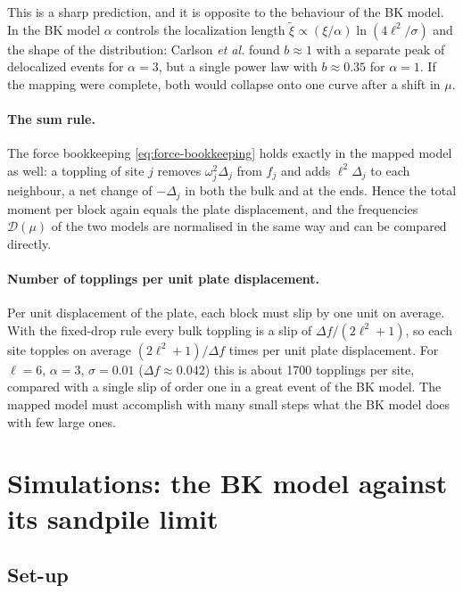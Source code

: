 This is a sharp prediction, and it is opposite to the behaviour of the BK model. In the BK model $\alpha$ controls the localization length
$\tilde\xi\propto(\xi/\alpha)\ln(4\ell^2/\sigma)$ and the shape of the distribution: Carlson \emph{et al.} found $b\approx1$ with a separate peak of
delocalized events for $\alpha=3$, but a single power law with $b\approx0.35$ for $\alpha=1$. If the mapping were complete, both would collapse onto
one curve after a shift in $\mu$.

\paragraph{The sum rule.} The force bookkeeping \cref{eq:force-bookkeeping} holds exactly in the mapped model as well: a toppling of site $j$ removes
$\omega_j^2\Delta_j$ from $f_j$ and adds $\ell^2\Delta_j$ to each neighbour, a net change of $-\Delta_j$ in both the bulk and at the ends. Hence the
total moment per block again equals the plate displacement, and the frequencies $\mathcal D(\mu)$ of the two models are normalised in the same way
and can be compared directly.

\paragraph{Number of topplings per unit plate displacement.} Per unit displacement of the plate, each block must slip by one unit on average. With the
fixed-drop rule every bulk toppling is a slip of $\Delta f/(2\ell^2+1)$, so each site topples on average $(2\ell^2+1)/\Delta f$ times per unit plate
displacement. For $\ell=6$, $\alpha=3$, $\sigma=0.01$ ($\Delta f\approx0.042$) this is about 1700 topplings per site, compared with a single slip of
order one in a great event of the BK model. The mapped model must accomplish with many small steps what the BK model does with few large ones.

\section{Simulations: the BK model against its sandpile limit}
\label{sec:map-comparison}

\subsection{Set-up}

